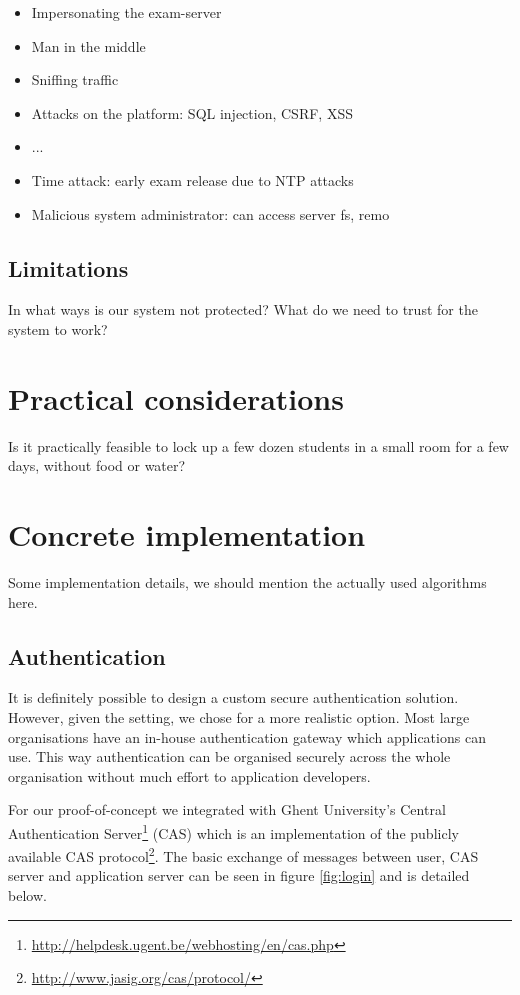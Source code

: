 \documentclass{article}
\begin{document}
\begin{itemize}
\item Impersonating the exam-server
\item Man in the middle
\item Sniffing traffic
\item Attacks on the platform: SQL injection, CSRF, XSS
\item ...
\item Time attack: early exam release due to NTP attacks
\item Malicious system administrator: can access server fs, remo
\end{itemize}

\subsection{Limitations}
\label{subsec:req-limitations}

In what ways is our system not protected? What do we need to trust for the
system to work?

\section{Practical considerations}
\label{sec:practical}

Is it practically feasible to lock up a few dozen students in a small room for a
few days, without food or water?

\section{Concrete implementation}
\label{sec:implementation}

Some implementation details, we should mention the actually used algorithms
here.

\subsection{Authentication}
\label{subsec:impl-authentication}

It is definitely possible to design a custom secure authentication solution.
However, given the setting, we chose for a more realistic option. Most large
organisations have an in-house authentication gateway which applications can
use. This way authentication can be organised securely across the whole
organisation without much effort to application developers.

For our proof-of-concept we integrated with Ghent University's Central
Authentication Server\footnote{\url{http://helpdesk.ugent.be/webhosting/en/cas.php}}
(CAS) which is an implementation of the publicly available CAS
protocol\footnote{\url{http://www.jasig.org/cas/protocol/}}. The basic
exchange of messages between user, CAS server and application server can be seen
in figure \ref{fig:login} and is detailed below.
\end{document}
